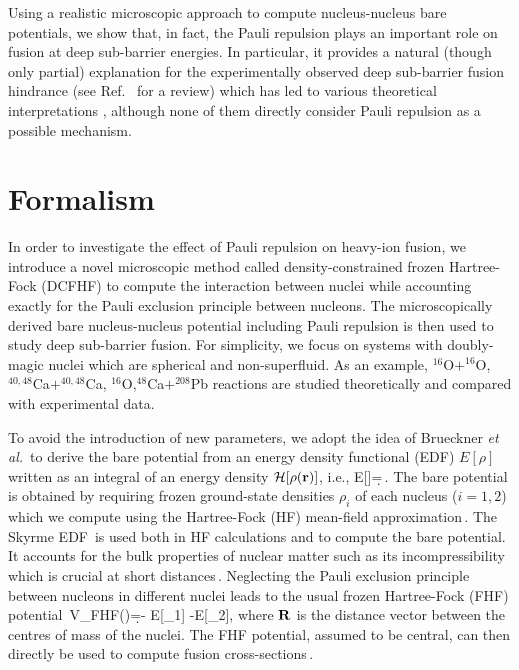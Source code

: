 Using a realistic microscopic approach to compute nucleus-nucleus bare potentials,
we  show that, in fact, the Pauli repulsion plays an important role on fusion at deep sub-barrier energies.
In particular, it provides a natural (though only partial) explanation 
for the experimentally observed deep sub-barrier fusion hindrance
\citep{jiang2002,dasgupta2007,stefanini2010}   (see Ref. \,\citep{back2014} for a review)
which has led to various theoretical interpretations
\citep{misicu2006,misicu2007,dasgupta2007,diaz-torres2008,diaz-torres2010,ichikawa2009b,ichikawa2015},
although none of them directly consider Pauli repulsion as a possible mechanism.

\section{Formalism}

In order to investigate the effect of Pauli repulsion on heavy-ion fusion,
we introduce a novel microscopic method called density-constrained frozen Hartree-Fock (DCFHF)
to compute the interaction between nuclei while accounting exactly 
for the Pauli exclusion principle between nucleons.
The microscopically derived bare nucleus-nucleus potential 
including Pauli repulsion is then used to study deep sub-barrier fusion.
For simplicity, we focus on systems with doubly-magic nuclei which are spherical and non-superfluid. 
As an example, $^{16}$O$+^{16}$O, $^{40,48}$Ca$+^{40,48}$Ca, $^{16}$O,$^{48}$Ca$+^{208}$Pb
reactions are studied theoretically and compared with experimental data.

To avoid the introduction of new parameters, we adopt the idea of Brueckner \textit{et al.}\,\citep{brueckner1968}
to derive the bare potential from an energy density functional (EDF)  $E[\rho]$
written as an integral of an energy density ${\mathcal{H}}[\rho({\bf r})]$, i.e.,
\oeq
E[\rho]=\int \d\vr \sdf \mH[\rho(\vr)]\,.
\ceq
The bare potential is obtained by requiring frozen ground-state densities $\rho_{i}$ 
of each nucleus ($i=1,2$) which we compute
using the Hartree-Fock (HF) mean-field approximation\,\citep{hartree1928,fock1930}. 
The Skyrme EDF\,\citep{skyrme1956} is used both in HF calculations and to compute the bare potential.
It accounts for the bulk properties of nuclear matter such as its incompressibility
which is crucial at short distances\,\citep{brueckner1968,misicu2006,hossain2015}.
Neglecting the Pauli exclusion principle between nucleons in different nuclei
leads to the usual frozen Hartree-Fock (FHF) 
potential\,\citep{denisov2002,washiyama2008,simenel2008,simenel2012}
\oeq
V_{FHF}(\vR)=\int \d\vr \sdf {} - E[\rho_1] -E[\rho_2],
\ceq
where ${\bf R}$ is the distance vector between the centres of mass of the nuclei.
The FHF potential, assumed to be central, can then directly be used to compute
fusion cross-sections\,\citep{simenel2013b,bourgin2016,vophuoc2016}.

